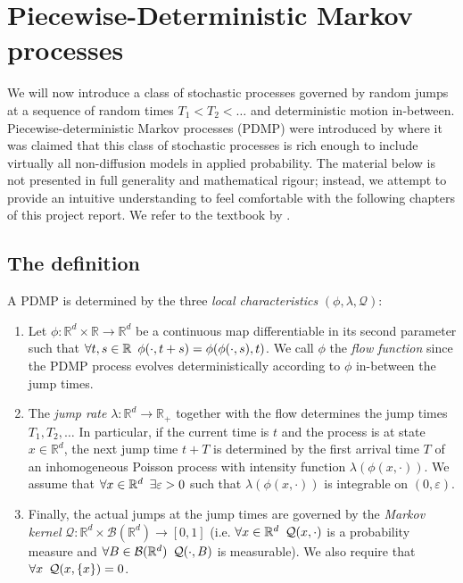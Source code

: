 \documentclass[report.tex]{subfiles}
\begin{document}
\section{Piecewise-Deterministic Markov processes}

We will now introduce a class of stochastic processes governed by random jumps at
a sequence of random times $T_{1} < T_{2} < \dots$ and deterministic motion
in-between. Piecewise-deterministic Markov processes (PDMP) were introduced by
\citet{davis1984piecewise} where it was claimed
that this class of stochastic processes is rich enough to include virtually
all non-diffusion models in applied probability.
The material below is not presented in full generality
and mathematical rigour; instead, we attempt to provide an intuitive
understanding to feel comfortable with the following chapters of this project
report.
We refer to the textbook by \citet{davis1993markov}.

\subsection{The definition}
\label{pdmp-definition}

A PDMP is determined by the three \textit{local characteristics}
$(\phi, \lambda, \mathcal{Q})$:

\begin{enumerate}
  \item Let $\phi : \mathbb{R}^{d} \times \mathbb{R} \to \mathbb{R}^{d}$
        be a continuous map differentiable in its second parameter such that
        $\forall t,s \in \mathbb{R} \enskip
        \phi(\cdot, t + s) = \phi(\phi(\cdot, s), t)$.
        We call $\phi$ the \textit{flow function} since the PDMP process evolves
        deterministically according to $\phi$ in-between the jump times.
  \item The \textit{jump rate}
        $\lambda : \mathbb{R}^{d} \to \mathbb{R}_{+}$
        together with the flow determines the jump times $T_{1}, T_{2}, \dots$
        In particular, if the current time is $t$ and the process is at state
        $x \in \mathbb{R}^{d}$, the next jump time $t + T$ is determined by
        the first arrival time $T$ of an inhomogeneous Poisson process
        with intensity function
        $\lambda(\phi(x, \cdot))$. We assume that
        $\forall x \in \mathbb{R}^{d} \enskip \exists \varepsilon > 0$ such that
        $\lambda(\phi(x, \cdot))$ is integrable on $(0, \varepsilon)$.

  \item Finally, the actual jumps at the jump times are governed by the
        \textit{Markov kernel}
        $\mathcal{Q} : \mathbb{R}^{d} \times \mathcal{B}(\mathbb{R}^{d})
         \to [0, 1]$
        (i.e. $\forall x \in \mathbb{R}^{d} \enskip \mathcal{Q}(x, \cdot)$
        is a probability measure
        and $\forall B \in \mathcal{B}(\mathbb{R}^{d}) \enskip
        \mathcal{Q}(\cdot, B)$ is measurable).
        We also require that $\forall x \enskip \mathcal{Q}(x, \{x\}) = 0$.
\end{enumerate}
\end{document}
